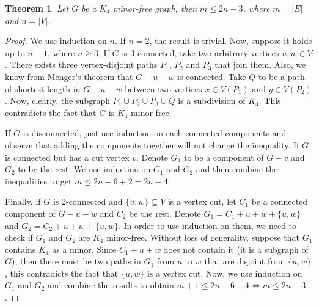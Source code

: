 \documentclass{tufte-handout}
\newtheorem{thm}{Theorem}
\theoremstyle{definition}
\theoremstyle{remark}
\begin{document}
\begin{thm}
	Let $G$ be a $K_4$ minor-free graph, then $m \leq 2n-3$, where $m = |E|$ and $n = |V|$.
\end{thm}
\begin{proof}
	We use induction on $n$. If $n=2$, the result is trivial. Now, suppose it holds up to $n-1$, where $n \geq 3$. If $G$ is $3$-connected, take two arbitrary vertices $u,w \in V$. There exists three vertex-disjoint paths $P_1$, $P_2$ and $P_3$ that join them. Also, we know from Menger's theorem that $G-u-w$ is connected. Take $Q$ to be a path of shortest length in $G-u-w$ between two vertices $x \in V(P_1)$ and $y\in V(P_2)$. Now, clearly, the subgraph $P_1 \cup P_2 \cup P_3 \cup Q$ is a subdivision of $K_4$. This contradicts the fact that $G$ is $K_4$ minor-free.
	
	If $G$ is disconnected, just use induction on each connected components and observe that adding the components together will not change the inequality. If $G$ is connected but has a cut vertex $v$. Denote $G_1$ to be a component of $G-v$ and $G_2$ to be the rest. We use induction on $G_1$ and $G_2$ and then combine the inequalities to get $m \leq 2n-6+2  = 2n-4$.
	
	Finally, if $G$ is $2$-connected and $\{u,w\} \subseteq V$ is a vertex cut, let $C_1$ be a connected component of $G-u-w$ and $C_2$ be the rest. Denote $G_1 = C_1 + u +w + \{u,w\}$ and $G_2 = C_2 + u+w+ \{u,w\}$. In order to use induction on them, we need to check if $G_1$ and $G_2$ are $K_4$ minor-free. Without loss of generality, suppose that $G_1$ contains $K_4$ as a minor. Since $C_1 +u+w$ does not contain it (it is a subgraph of $G$), then there must be two paths in $G_1$ from $u$ to $w$ that are disjoint from $\{u,w\}$, this contradicts the fact that $\{u,w\}$ is a vertex cut. Now, we use induction on $G_1$ and $G_2$ and combine the results to obtain $m +1 \leq 2n-6+4 \Leftrightarrow m \leq 2n-3$.
\end{proof}
\end{document}
